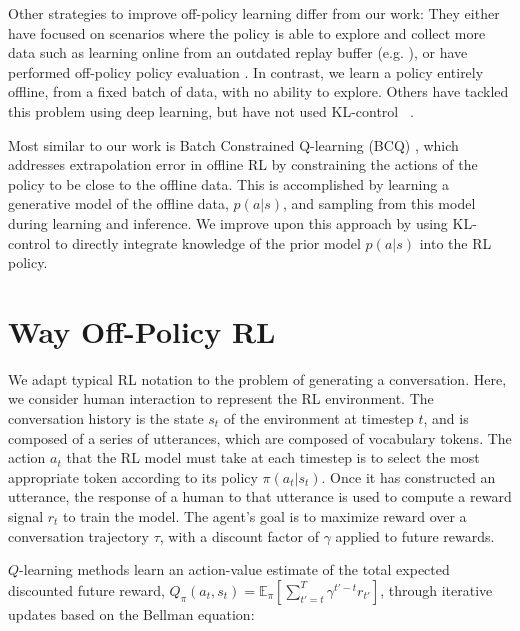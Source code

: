 Other strategies to improve off-policy learning differ from our work:  They either have focused on scenarios where the policy is able to explore and collect more data \cite{degris2012off,riedmiller2005neural} such as learning online from an outdated replay buffer (e.g. \cite{munos2016safe}), or have performed off-policy policy evaluation \cite{farajtabar2018more,jiang2016doubly,precup2000eligibility,thomas2016data}. In contrast, we learn a policy entirely offline, from a fixed batch of data, with no ability to explore. Others have tackled this problem using deep learning, but have not used KL-control
~\cite{liu2019off,gelada2019off,bhatt2019crossnorm,kumar2019stabilizing,agarwal2019striving,fujimoto2018off, ghasemipour2020emaq}.

Most similar to our work is Batch Constrained Q-learning (BCQ) \cite{fujimoto2018off}, which addresses extrapolation error in offline RL by  constraining the actions of the policy to be close to the offline data. This is accomplished by learning a generative model of the offline data, $p(a|s)$, and sampling from this model during learning and inference. We improve upon this approach by using KL-control to directly integrate knowledge of the prior model $p(a|s)$ into the RL policy. 

\section{Way Off-Policy RL}
\label{sec:methods}

We adapt typical RL notation to the problem of generating a conversation. Here, we consider human interaction to represent the RL environment. The conversation history is the state $s_t$ of the environment at timestep $t$, and is composed of a series of utterances, which are composed of vocabulary tokens. The action $a_t$ that the RL model must take at each timestep is to select the most appropriate token according to its policy $\pi(a_t|s_t)$. Once it has constructed an utterance, the response of a human to that utterance is used to compute a reward signal $r_t$ to train the model. The agent's goal is to maximize reward over a conversation trajectory $\tau$, with a discount factor of $\gamma$ applied to future rewards.  

$Q$-learning methods learn an action-value estimate of the total expected discounted future reward, $Q_{\pi}(a_t,s_t) = \mathbb{E}_{\pi}[\sum_{t'=t}^{T} \gamma^{t'-t}r_{t'}]$, through iterative updates based on the Bellman equation:

